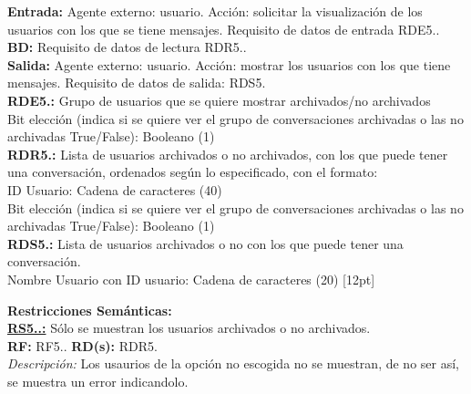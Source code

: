 \textbf{\textcolor{rojo}{Entrada:}} Agente externo: usuario. Acción: solicitar la visualización de los usuarios con los que se tiene mensajes. 
Requisito de datos de entrada \textcolor{azul}{RDE5.\theRDE}. \\[6pt]

\textbf{\textcolor{rojo}{BD:}} Requisito de datos de lectura \textcolor{azul}{RDR5.\theRDR}. \\[6pt]

\textbf{\textcolor{rojo}{Salida:}} Agente externo: usuario. Acción: mostrar los usuarios con los que tiene mensajes. 
Requisito de datos de salida: \textcolor{azul}{RDS5.\theRDS} \\[12pt]

\textcolor{azul}{\textbf{RDE5.\theRDE:}} Grupo de usuarios que se quiere mostrar archivados/no archivados\\
\hspace*{1cm} Bit elección (indica si se quiere ver el grupo de conversaciones archivadas o las no archivadas True/False): Booleano (1) \\[12pt]

\textcolor{azul}{\textbf{RDR5.\theRDR:}} Lista de usuarios archivados o no archivados, con los que puede tener una conversación, ordenados según lo especificado, con el formato:\\
\hspace*{1cm} ID Usuario: Cadena de caracteres (40) \\
\hspace*{1cm} Bit elección (indica si se quiere ver el grupo de conversaciones archivadas o las no archivadas True/False): Booleano (1) \\[12pt]

\textcolor{azul}{\textbf{RDS5.\theRDS:}} Lista de usuarios archivados o no con los que puede tener una conversación. \\
\hspace*{1cm} Nombre Usuario con ID usuario: Cadena de caracteres (20) [12pt]

\setcounter{RS}{1}
\textbf{\textcolor{verde}{Restricciones Semánticas:}} \\[6pt]
\textbf{\textcolor{verde}{\underline{RS5.\theRF.\theRS:}}} Sólo se muestran los usuarios archivados o no archivados. \\
\textbf{RF:} RF5.\theRF. \textbf{RD(s):} RDR5.\theRDR \\
\hspace*{1cm} \textit{Descripción:} Los usaurios de la opción no escogida no se muestran, de no ser así, se muestra un error indicandolo. \\ [6pt]


